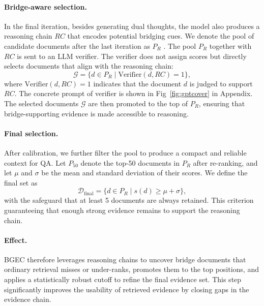 \documentclass{article} %
\begin{document}
\paragraph{Bridge-aware selection.}
In the final iteration, besides generating dual thoughts, the model also produces a reasoning chain $RC$ that encodes potential bridging cues.  
We denote the pool of candidate documents after the last iteration as $P_R$ . 
The pool $P_R$ together with $RC$ is sent to an LLM verifier.  
The verifier does not assign scores but directly selects documents that align with the reasoning chain:
\begin{equation}
\mathcal{G} = \{ d \in P_R \mid \text{Verifier}(d, RC) = 1 \}, 
\label{eq:bg-g}
\end{equation}
where $\text{Verifier}(d,RC)=1$ indicates that the document $d$ is judged to support $RC$. The concrete prompt of verifier is shown in Fig~\ref{fig:gptcover} in Appendix.
The selected documents $\mathcal{G}$ are then promoted to the top of $P_R$, ensuring that bridge-supporting evidence is made accessible to reasoning.

\paragraph{Final selection.}
After calibration, we further filter the pool to produce a compact and reliable context for QA.  
Let $P_{50}$ denote the top-50 documents in $P_R$ after re-ranking, and let $\mu$ and $\sigma$ be the mean and standard deviation of their scores.  
We define the final set as
\begin{equation}
\mathcal{D}_{\text{final}} = \{ d \in P_R \mid s(d) \geq \mu + \sigma \}, 
\label{eq:bg-final}
\end{equation}
with the safeguard that at least 5 documents are always retained.  
This criterion guaranteeing that enough strong evidence remains to support the reasoning chain.

\paragraph{Effect.}
BGEC therefore leverages reasoning chains to uncover bridge documents that ordinary retrieval misses or under-ranks, promotes them to the top positions, and applies a statistically robust cutoff to refine the final evidence set.  
This step significantly improves the usability of retrieved evidence by closing gaps in the evidence chain.
\end{document}
